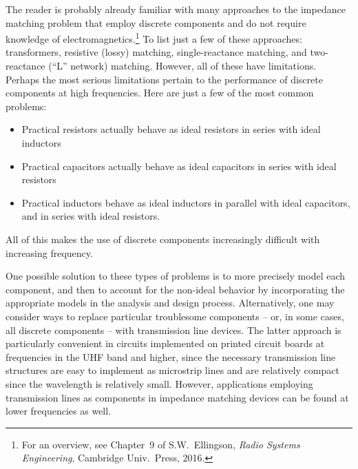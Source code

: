 The reader is probably already familiar with many approaches to the impedance matching problem that employ discrete components and do not require knowledge of electromagnetics.\footnote{For an overview, see Chapter~9 of S.W.\ Ellingson, \emph{Radio Systems Engineering}, Cambridge Univ.\ Press, 2016.}  To list just a few of these approaches:  transformers, resistive (lossy) matching, single-reactance matching, and two-reactance (``L'' network) matching.
However, all of these have limitations.
Perhaps the most serious limitations pertain to the performance of discrete components at high frequencies.
Here are just a few of the most common problems:
%
\begin{itemize}
\item Practical resistors actually behave as ideal resistors in series with ideal inductors 
\item Practical capacitors actually behave as ideal capacitors in series with ideal resistors
\item Practical inductors behave as ideal inductors in parallel with ideal capacitors, and in series with ideal resistors.
\end{itemize}
%
All of this makes the use of discrete components increasingly difficult with increasing frequency.

One possible solution to these types of problems is to more precisely model each component, and then to account for the non-ideal behavior by incorporating the appropriate models in the analysis and design process.
Alternatively, one may consider ways to replace particular troublesome components -- or, in some cases, all discrete components -- with transmission line devices.
The latter approach is particularly convenient in circuits implemented on printed circuit boards at frequencies in the UHF band and higher, since the necessary transmission line structures are easy to implement as microstrip 
lines and are relatively compact since the wavelength is relatively small.
However, applications employing transmission lines as components in impedance matching devices can be found at lower frequencies as well.

